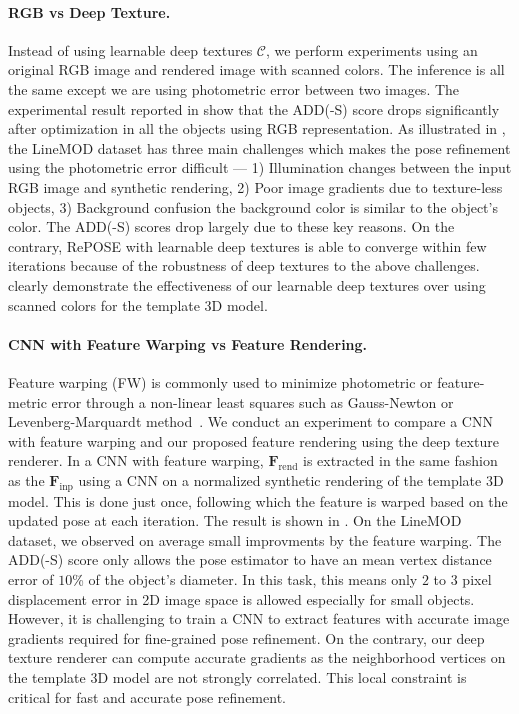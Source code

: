 \documentclass[10pt,twocolumn,letterpaper]{article}
\begin{document}
\paragraph{RGB vs Deep Texture.}
Instead of using learnable deep textures $\mathcal{C}$, we perform experiments using an original RGB image and rendered image with scanned colors. The inference is all the same except we are using photometric error between two images.
The experimental result reported in   show that the ADD(-S) score drops significantly after optimization in all the objects using RGB representation. As illustrated in , the LineMOD dataset has three main challenges which makes the pose refinement using the photometric error difficult --- 1) Illumination changes between the input RGB image and synthetic rendering, 2) Poor image gradients due to texture-less objects, 3) Background confusion \ie the background color is similar to the object's color.
The ADD(-S) scores drop largely due to these key reasons.
On the contrary, RePOSE with learnable deep textures is able to converge within few iterations because of the robustness of deep textures to the above challenges.
 clearly demonstrate the effectiveness of our learnable deep textures over using scanned colors for the template 3D model.

\paragraph{CNN with Feature Warping vs Feature Rendering.}
Feature warping (FW) is commonly used to minimize photometric or feature-metric error through a non-linear least squares such as Gauss-Newton or Levenberg-Marquardt method~\cite{10.1007/978-3-642-15552-9_3,Triggs:1999:BAM:646271.685629}.
We conduct an experiment to compare a CNN with feature warping and our proposed feature rendering using the deep texture renderer.
In a CNN with feature warping, $\mathbf{F}_\text{rend}$ is extracted in the same fashion as the $\mathbf{F}_\text{inp}$ using a CNN on a normalized synthetic rendering of the template 3D model. This is done just once, following which the feature is warped based on the updated pose at each iteration.
The result is shown in .
On the LineMOD dataset, we observed on average small improvments by the feature warping. The ADD(-S) score only allows the pose estimator to have an mean vertex distance error of $10$\% of the object's diameter. In this task, this means only $2$ to $3$ pixel displacement error in 2D image space is allowed especially for small objects. However, it is challenging to train a CNN to extract features with accurate image gradients required for fine-grained pose refinement.
On the contrary, our deep texture renderer can compute accurate gradients as the neighborhood vertices on the template 3D model are not strongly correlated.
This local constraint is critical for fast and accurate pose refinement.
\end{document}

